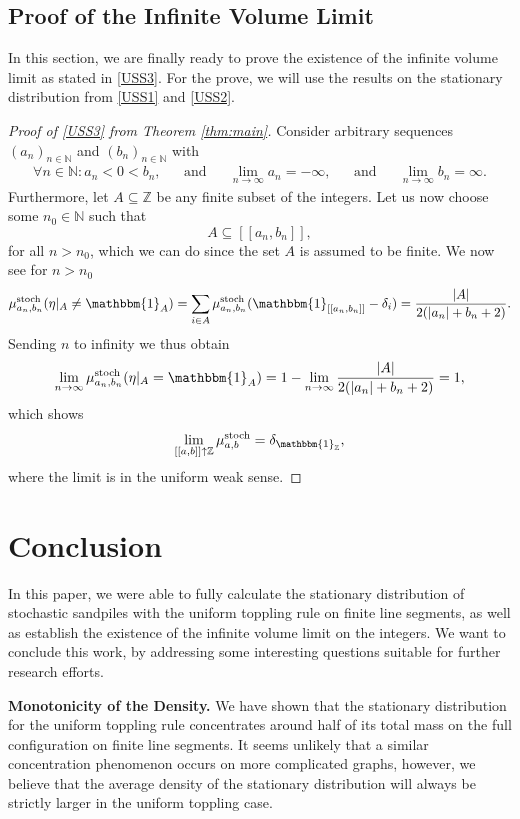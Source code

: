 \documentclass[11pt]{article}
\newcommand{\N}{\mathbb{N}}
\newcommand{\Z}{\mathbb{Z}}
\newcommand{\stoch}{\text{stoch}}
\newcommand{\stat}[2]{\mu^{\stoch}_{#1,#2}}
\newcommand{\one}{\mathbbm{1}}
\begin{document}
\subsection{Proof of the Infinite Volume Limit}\label{sec:proof-infinite-volume}

In this section, we are finally ready to prove the existence of the infinite volume limit as stated in \ref{USS3}. For the prove, we will use the results on the stationary distribution from \ref{USS1} and \ref{USS2}.

\begin{proof}[Proof of \ref{USS3} from Theorem \ref{thm:main}]
    Consider arbitrary sequences $(a_n)_{n\in\N}$ and $(b_n)_{n\in\N}$ with
    \begin{align*}
    \forall n\in\N: a_n<0<b_n,&&\text{and}&&\lim_{n\rightarrow\infty}a_n=-\infty,&&\text{and}&&\lim_{n\rightarrow\infty}b_n=\infty.
    \end{align*}
    Furthermore, let $A\subseteq\Z$ be any finite subset of the integers. Let us now choose some $n_0\in\N$ such that
    $$A\subseteq [[a_n,b_n]],$$
    for all $n>n_0$, which we can do since the set $A$ is assumed to be finite. We now see for $n>n_0$
    \begin{align*}
        \stat{a_n}{b_n}(\eta|_A\neq\one_A)=\sum_{i\in A}\stat{a_n}{b_n}(\one_{[[a_n,b_n]]}-\delta_i)=\frac{|A|}{2(|a_n|+b_n+2)}.
    \end{align*}
    Sending $n$ to infinity we thus obtain
    $$\lim_{n\rightarrow\infty}\stat{a_n}{b_n}(\eta|_A=\one_A)=1-\lim_{n\rightarrow\infty}\frac{|A|}{2(|a_n|+b_n+2)}=1,$$
    which shows
    $$\lim_{[[a,b]]\uparrow \Z}\stat{a}{b}=\delta_{\mathbbm{1}_\Z},$$
    where the limit is in the uniform weak sense.
\end{proof}
\section{Conclusion}\label{sec:conclusion}
In this paper, we were able to fully calculate the stationary distribution of stochastic sandpiles with the uniform toppling rule on finite line segments, as well as establish the existence of the infinite volume limit on the integers. We want to conclude this work, by addressing some interesting questions suitable for further research efforts.

\textbf{Monotonicity of the Density.} We have shown that the stationary distribution for the uniform toppling rule concentrates around half of its total mass on the full configuration on finite line segments. It seems unlikely that a similar concentration phenomenon occurs on more complicated graphs, however, we believe that the average density of the stationary distribution will always be strictly larger in the uniform toppling case.
\end{document}
